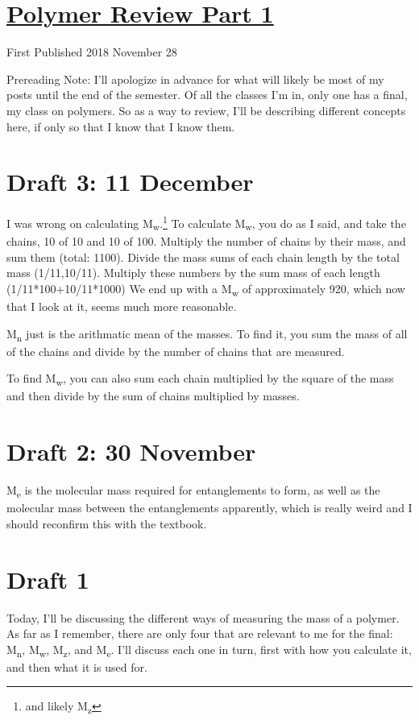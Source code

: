 \documentclass[12pt]{article}[titlepage]
\newcommand{\1}{\={a}}
\newcommand{\2}{\={e}}
\newcommand{\3}{\={\i}}
\newcommand{\4}{\=o}
\newcommand{\5}{\=u}
\newcommand{\6}{\={A}}
\newcommand{\sub}[1]{\textsubscript{#1}}
\renewcommand{\,}{\textsuperscript{,}}
\begin{document}
\doublespacing
\section{\href{polymer-1.html}{Polymer Review Part 1}}
First Published 2018 November 28

Prereading Note: I'll apologize in advance for what will likely be most of my posts until the end of the semester.
Of all the classes I'm in, only one has a final, my class on polymers.
So as a way to review, I'll be describing different concepts here, if only so that I know that I know them.
\section{Draft 3: 11 December}
I was wrong on calculating M\sub{w}.\footnote{and likely M\sub{z}}
To calculate M\sub{w}, you do as I said, and take the chains, 10 of 10 and 10 of 100.
Multiply the number of chains by their mass, and sum them (total: 1100).
Divide the mass sums of each chain length by the total mass (1/11,10/11).
Multiply these numbers by the sum mass of each length (1/11*100+10/11*1000)
We end up with a M\sub{w} of approximately 920, which now that I look at it, seems much more reasonable.

M\sub{n} just is the arithmatic mean of the masses.
To find it, you sum the mass of all of the chains and divide by the number of chains that are measured.

To find M\sub{w}, you can also sum each chain multiplied by the square of the mass and then divide by the sum of chains multiplied by masses.

\section{Draft 2: 30 November}
M\sub{e} is the molecular mass required for entanglements to form, as well as the molecular mass between the entanglements apparently, which is really weird and I should reconfirm this with the textbook.
\section{Draft 1}
Today, I'll be discussing the different ways of measuring the mass of a polymer.
As far as I remember, there are only four that are relevant to me for the final: M\sub{n}, M\sub{w}, M\sub{z}, and M\sub{e}.
I'll discuss each one in turn, first with how you calculate it, and then what it is used for.
\end{document}
